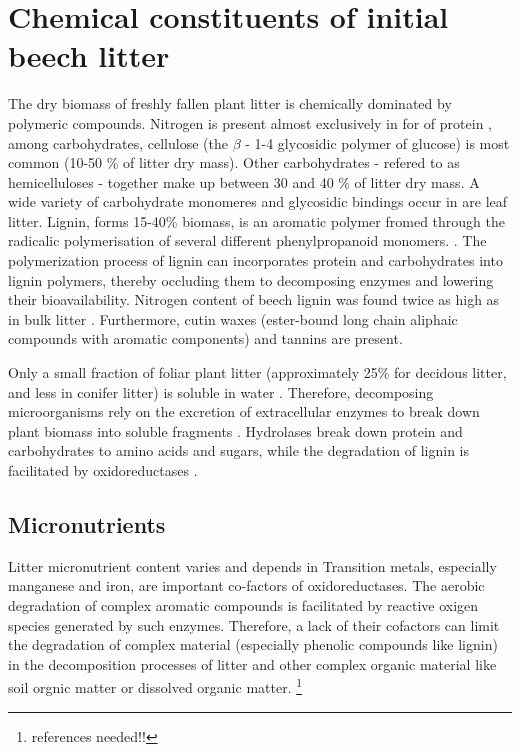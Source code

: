 \section{Chemical constituents of initial beech litter}

The dry biomass of freshly fallen plant litter is chemically dominated by polymeric compounds. Nitrogen is present almost exclusively in for of protein \citep{Wanek2010}, among carbohydrates, cellulose (the $\beta$ - 1-4 glycosidic polymer of glucose) is most common (10-50 \% of litter dry mass). Other carbohydrates - refered to as hemicelluloses - together make up between 30 and 40 \% of litter dry mass. A wide variety of carbohydrate monomeres and glycosidic bindings occur in are leaf litter. Lignin, forms 15-40\% biomass, is an aromatic polymer fromed through the radicalic polymerisation of several different phenylpropanoid monomers. \citep[pp. 54f]{Berg2008}.  The polymerization process of lignin can incorporates protein and carbohydrates into lignin polymers, thereby occluding them to decomposing enzymes and lowering their bioavailability. Nitrogen content of beech lignin was found twice as high as in bulk litter \citep{Dykmans2002}. Furthermore, cutin waxes (ester-bound long chain aliphaic compounds with aromatic components) and tannins are present.

Only a small fraction of foliar plant litter (approximately 25\% for decidous litter, and less in conifer litter) is soluble in water \citep{Berg2008}. Therefore, decomposing microorganisms rely on the excretion of extracellular enzymes to break down plant biomass into soluble fragments \cite{Klotzbucher2011}. Hydrolases break down protein and carbohydrates to amino acids and sugars, while the degradation of lignin is facilitated by oxidoreductases \citep{Sinsabaugh2011}.

\subsection{Micronutrients}

Litter micronutrient content varies and depends in 
Transition metals, especially manganese and iron, are important co-factors of oxidoreductases. The aerobic degradation of complex aromatic compounds is facilitated by reactive oxigen species generated by such enzymes. Therefore, a lack of their cofactors can limit the degradation of complex material (especially phenolic compounds like lignin) in the decomposition processes of litter and other complex organic material like soil orgnic matter or dissolved organic matter. \footnote{references needed!!}

